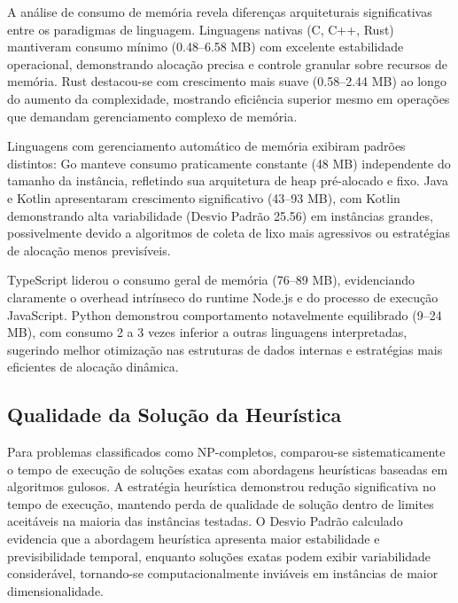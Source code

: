 \documentclass[12pt,a4paper]{article}
\begin{document}
A análise de consumo de memória revela diferenças arquiteturais significativas entre os paradigmas de linguagem. Linguagens nativas (C, C++, Rust) mantiveram consumo mínimo (0.48--6.58 MB) com excelente estabilidade operacional, demonstrando alocação precisa e controle granular sobre recursos de memória. Rust destacou-se com crescimento mais suave (0.58--2.44 MB) ao longo do aumento da complexidade, mostrando eficiência superior mesmo em operações que demandam gerenciamento complexo de memória.

Linguagens com gerenciamento automático de memória exibiram padrões distintos: Go manteve consumo praticamente constante (48 MB) independente do tamanho da instância, refletindo sua arquitetura de heap pré-alocado e fixo. Java e Kotlin apresentaram crescimento significativo (43--93 MB), com Kotlin demonstrando alta variabilidade (Desvio Padrão 25.56) em instâncias grandes, possivelmente devido a algoritmos de coleta de lixo mais agressivos ou estratégias de alocação menos previsíveis.

TypeScript liderou o consumo geral de memória (76--89 MB), evidenciando claramente o overhead intrínseco do runtime Node.js e do processo de execução JavaScript. Python demonstrou comportamento notavelmente equilibrado (9--24 MB), com consumo 2 a 3 vezes inferior a outras linguagens interpretadas, sugerindo melhor otimização nas estruturas de dados internas e estratégias mais eficientes de alocação dinâmica.

\subsection{Qualidade da Solução da Heurística}

Para problemas classificados como NP-completos, comparou-se sistematicamente o tempo de execução de soluções exatas com abordagens heurísticas baseadas em algoritmos gulosos. A estratégia heurística demonstrou redução significativa no tempo de execução, mantendo perda de qualidade de solução dentro de limites aceitáveis na maioria das instâncias testadas. O Desvio Padrão calculado evidencia que a abordagem heurística apresenta maior estabilidade e previsibilidade temporal, enquanto soluções exatas podem exibir variabilidade considerável, tornando-se computacionalmente inviáveis em instâncias de maior dimensionalidade.
\end{document}

